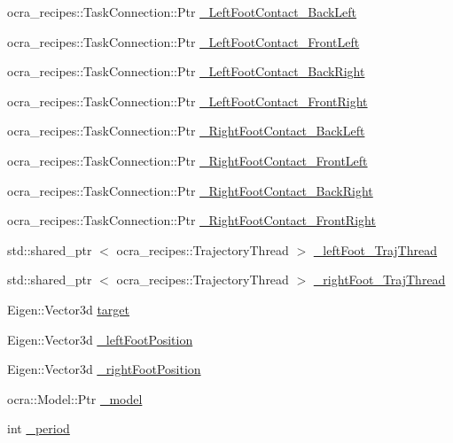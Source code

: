 \begin{DoxyCompactItemize}
\item 
ocra\-\_\-recipes\-::\-Task\-Connection\-::\-Ptr \hyperlink{classStepController_ad778378c6e6ac12d972cc8c5a986dcf9}{\-\_\-\-Left\-Foot\-Contact\-\_\-\-Back\-Left}
\item 
ocra\-\_\-recipes\-::\-Task\-Connection\-::\-Ptr \hyperlink{classStepController_a74e19501ce4f336bb4c26beebe3d39e2}{\-\_\-\-Left\-Foot\-Contact\-\_\-\-Front\-Left}
\item 
ocra\-\_\-recipes\-::\-Task\-Connection\-::\-Ptr \hyperlink{classStepController_a9c733b7ab0ce610c84158f7d1de60267}{\-\_\-\-Left\-Foot\-Contact\-\_\-\-Back\-Right}
\item 
ocra\-\_\-recipes\-::\-Task\-Connection\-::\-Ptr \hyperlink{classStepController_a1a4e831d573ab9e0f25680da7d065a77}{\-\_\-\-Left\-Foot\-Contact\-\_\-\-Front\-Right}
\item 
ocra\-\_\-recipes\-::\-Task\-Connection\-::\-Ptr \hyperlink{classStepController_a57947ee8824b3cb3ee34e936431588df}{\-\_\-\-Right\-Foot\-Contact\-\_\-\-Back\-Left}
\item 
ocra\-\_\-recipes\-::\-Task\-Connection\-::\-Ptr \hyperlink{classStepController_a0e1c5ce837e4811214a97c42edc66721}{\-\_\-\-Right\-Foot\-Contact\-\_\-\-Front\-Left}
\item 
ocra\-\_\-recipes\-::\-Task\-Connection\-::\-Ptr \hyperlink{classStepController_ac999bb1e7b4b005da35093345c0cb4de}{\-\_\-\-Right\-Foot\-Contact\-\_\-\-Back\-Right}
\item 
ocra\-\_\-recipes\-::\-Task\-Connection\-::\-Ptr \hyperlink{classStepController_a9f06562625b657c280dc688bcad421be}{\-\_\-\-Right\-Foot\-Contact\-\_\-\-Front\-Right}
\item 
std\-::shared\-\_\-ptr\*
$<$ ocra\-\_\-recipes\-::\-Trajectory\-Thread $>$ \hyperlink{classStepController_adc2b0bf2d3c302c54d659d44cb34ba3e}{\-\_\-left\-Foot\-\_\-\-Traj\-Thread}
\item 
std\-::shared\-\_\-ptr\*
$<$ ocra\-\_\-recipes\-::\-Trajectory\-Thread $>$ \hyperlink{classStepController_a37b943ed8733490d028687997944e478}{\-\_\-right\-Foot\-\_\-\-Traj\-Thread}
\item 
\-Eigen\-::\-Vector3d \hyperlink{classStepController_a588d5b149eb4a6877e89ecff37d0f91d}{target}
\item 
\-Eigen\-::\-Vector3d \hyperlink{classStepController_a6bc27bbd20adf3bc0a1b010a14dece95}{\-\_\-left\-Foot\-Position}
\item 
\-Eigen\-::\-Vector3d \hyperlink{classStepController_a064d9f5406f9221e4351617a177c1cef}{\-\_\-right\-Foot\-Position}
\item 
ocra\-::\-Model\-::\-Ptr \hyperlink{classStepController_aa07914c0186c24fd4fc02612d0ee6332}{\-\_\-model}
\item 
int \hyperlink{classStepController_a8b98494b6b9d13b41c6838d127078085}{\-\_\-period}
\end{DoxyCompactItemize}


